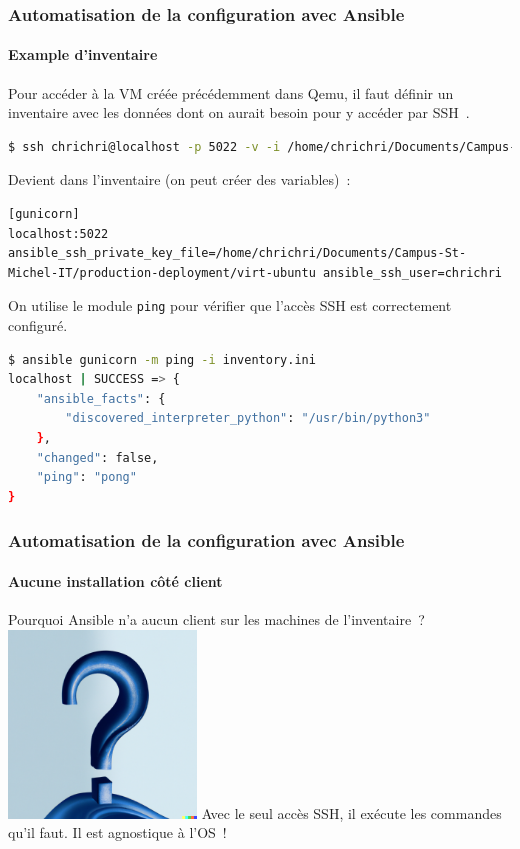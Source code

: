 \documentclass{beamer}
\begin{document}
    \begin{frame}[fragile]
        \transdissolve
        \frametitle{Automatisation de la configuration avec Ansible}
        \framesubtitle{Example d'inventaire}
        Pour accéder à la VM créée précédemment dans Qemu, il faut définir un inventaire avec les données dont on aurait besoin pour y accéder par SSH~.
        \begin{lstlisting}[language=bash]
$ ssh chrichri@localhost -p 5022 -v -i /home/chrichri/Documents/Campus-St-Michel-IT/production-deployment/virt-ubuntu ansible_ssh_user=chrichri
        \end{lstlisting}
        Devient dans l'inventaire (on peut créer des variables)~:
        \begin{lstlisting}
[gunicorn]
localhost:5022 ansible_ssh_private_key_file=/home/chrichri/Documents/Campus-St-Michel-IT/production-deployment/virt-ubuntu ansible_ssh_user=chrichri
        \end{lstlisting}
        On utilise le module \lstinline{ping} pour vérifier que l'accès SSH est correctement configuré.
        \begin{lstlisting}[language=bash]
$ ansible gunicorn -m ping -i inventory.ini
localhost | SUCCESS => {
    "ansible_facts": {
        "discovered_interpreter_python": "/usr/bin/python3"
    },
    "changed": false,
    "ping": "pong"
}
        \end{lstlisting}
    \end{frame}

    \begin{frame}
        \transdissolve
        \frametitle{Automatisation de la configuration avec Ansible}
        \framesubtitle{Aucune installation côté client}
        Pourquoi Ansible n'a aucun client sur les machines de l'inventaire~?
        \bigbreak
        \centering
        \includegraphics[width=5cm]{image/question-mark-on-a-blank-background.png}
        \bigbreak
        \pause
        \flushleft
        Avec le seul accès SSH, il exécute les commandes qu'il faut.
        Il est agnostique à l'OS~!
    \end{frame}
\end{document}

